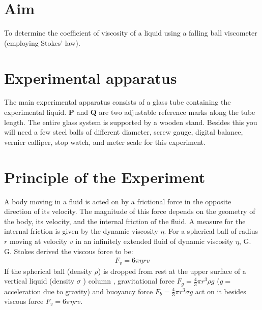 \documentclass{article}
\begin{document}
	\section{Aim}
	
	To determine the coefficient of viscosity of a liquid using a falling ball viscometer 
	(employing Stokes’ law).
	
	\section{Experimental apparatus}
	
	The main experimental apparatus consists of a glass tube containing the experimental 
	liquid. \textbf{P} and \textbf{Q} are two adjustable reference marks along the tube length. The entire glass 
	system is supported by a wooden stand. Besides this you will need a few steel balls of 
	different diameter, screw gauge, digital balance, vernier calliper, stop watch, and meter scale 
	for this experiment.
	
	\section{Principle of the Experiment}
	
	A body moving in a fluid is acted on by a frictional force in the opposite direction of its 
	velocity. The magnitude of this force depends on the geometry of the body, its velocity, and 
	the internal friction of the fluid. A measure for the internal friction is given by the dynamic 
	viscosity \textbf{$\eta$}. For a spherical ball of radius \textbf{$r$} moving at velocity \textbf{$v$} in an infinitely extended 
	fluid of dynamic viscosity \textbf{$\eta$}, G. G. Stokes derived the viscous force to be:
	\begin{align}
		F_{v} = 6\pi \eta r v
	\end{align}
	If the spherical ball (density $\rho$) is dropped from rest at the upper surface of a vertical liquid (density $\sigma$ ) column , gravitational force $F_{g} = \frac{4}{3} \pi r^{3} \rho g$ ($g=$ acceleration due to gravity) and buoyancy force $F_{b} = \frac{4}{3} \pi r^{3} \sigma g$ act on it besides viscous force $F_{v} = 6 \pi \eta r v$.
	
\end{document}
